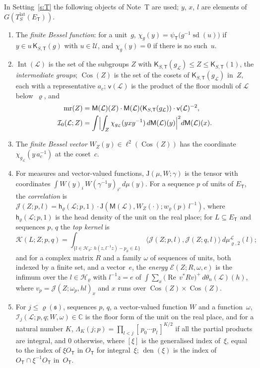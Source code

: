 \documentclass[11pt,a4paper]{article}
\newcommand{\m}[1]{\mbox{$#1$}}        %
\theoremstyle{plainx}
\theoremstyle{uprightx}
\newcommand{\fs}{\mathfrak{s}}                      %
\newcommand{\sT}{\mathsf{T}}                        %
\newcommand{\cL}{\mathcal{L}}                       %
\newcommand{\rh}[1]{\varrho(#1)}                    %
\newcommand{\ET}[1]{E_{#1}}                         %
\newcommand{\Tlat}[2]{T^{\mathrm{lat}}_{#1}(#2)}    %
\newcommand{\phs}[2]{\chi_{#1}(#2)}                 %
\newcommand{\IntG}[1]{\operatorname{Int}(#1)}       %
\newcommand{\umass}[1]{\mathsf{v}(#1)}              %
\newcommand{\fzf}[2]{\mathcal{I}_{0}(#1;#2)}        %
\newcommand{\Cos}[1]{\operatorname{Cos}(#1)}        %
\newcommand{\mr}[1]{\operatorname{mr}(#1)}          %
\newcommand{\bvec}[2]{W_{#1}(#2)}                   %
\newcommand{\corr}[3]{\mathcal{J}(#1;#2,#3)}        %
\newcommand{\topK}[4]{\mathcal{K}(#1;#2;#3,#4)}     %
\newcommand{\lenergy}[4]{\mathcal{E}(#1;#2,#3,#4)}  %
\newcommand{\KT}[3]{\mathsf{K}_{#1,#2}(#3)}                  %
\newcommand{\gM}[1]{\mathsf{M}(#1)}                 %
\newcommand{\mH}[1]{\theta_{n}(#1)}                 %
\newcommand{\hdens}[4]{\mathsf{h}_{#2}(#1;#3,#4)}   %
\newcommand{\fform}[6]{\mathcal{I}_{#2}(#1;#3,#4;#5,#6)} %
\newcommand{\bcorr}[3]{\mathrm{J}(#1,#2;#3)}        %
\newcommand{\fhw}[3]{\Lambda_{#1}(#2;#3)}           %
\newcommand{\weyl}[2]{w_{#1}(#2)}                   %
\newcommand{\rePart}{\operatorname{Re}}
\newcommand{\CC}{\mathbb{C}}
\begin{document}
In Setting~\ref{s:T} the following objects of Note~T are used; $y$, $x$, $l$ are elements of
\m{G(\Tlat{S}{\ET{\sT}})}.
\begin{enumerate}[label=\textup{(\alph*)},leftmargin=2.3em,itemsep=2pt]
\item The \emph{finite Bessel function}: for a unit~$g$, \m{\phs{g}{y}=\psi_{\sT}\bigl(g^{-1}\operatorname{sd}(u)\bigr)}
if \m{y\in u\,\KT{S}{\sT}{g}} with \m{u\in\mathcal U}, and \m{\phs{g}{y}=0} if there is no such~$u$.
\item \m{\IntG{\cL}} is the set of the subgroups $Z$ with \m{\KT{S}{\sT}{g_{\cL}}\le Z\le\KT{S}{\sT}{1}}, the
\emph{intermediate groups}; \m{\Cos{Z}} is the set of the cosets of \m{\KT{S}{\sT}{g_{\cL}}} in~$Z$, each with a
representative $a_c$; \m{\umass{\cL}} is the product of the floor moduli of $\cL$ below~$\varrho$, and
\[\begin{aligned}\mr{Z}&=\gM{\cL}(Z)\cdot\gM{\cL}(\KT{S}{\sT}{g_{\cL}})\cdot\umass{\cL}^{-2},\\
\fzf{\cL}{Z}&=\int\Bigl|\int_Z\phs{g_{\cL}}{yxy^{-1}}\,d\gM{\cL}(y)\Bigr|^2d\gM{\cL}(x).\end{aligned}\]
\item The \emph{finite Bessel vector} \m{\bvec{Z}{y}\in\ell^2(\Cos{Z})} has the coordinate
\m{\phs{g_{\cL}}{y\,a_c^{-1}}} at the coset~$c$.
\item For measures and vector-valued functions, \m{\bcorr{\mu}{W}{\gamma}} is the tensor with coordinates
\m{\int W(y)_i\,\overline{W(\gamma^{-1}y)_{i'}}\,d\mu(y)}. For a sequence $p$ of units of \m{\ET{\sT}}, the
\emph{correlation} is \m{\corr{Z}{p}{l}=\hdens{\cL}{\varrho}{p}{1}\cdot\bcorr{\gM{\cL}}{\bvec{Z}{\cdot}}{\weyl{\varrho}{p}\,l^{-1}}},
where \m{\hdens{\cL}{\varrho}{p}{1}} is the head density of the unit on the real place; for
\m{L\subseteq\ET{\sT}} and sequences $p$, $q$ the \emph{top kernel} is
\[\topK{L}{Z}{p}{q}=\int_{\{l\in\mathcal H_\varrho:\ h(z,l^{-1}z)-p_\varrho\in L\}}
\bigl\langle\corr{Z}{p}{l},\corr{Z}{q}{l}\bigr\rangle\,d\mu^{\cL}_{\varrho,2}(l);\]
and for a complex matrix $R$ and a family $\omega$ of sequences of units, both indexed by a finite set, and a
vector~$e$, the \emph{energy} \m{\lenergy{Z}{R}{\omega}{e}} is the infimum over the \m{l\in\mathcal H_\varrho} with
\m{l^{-1}z=e} of \m{\int\sum_{x}\bigl(\rePart\,v^*Rv\bigr)^{+}\,d\mH{\cL}(h)}, where
\m{v_p=\corr{Z}{\omega_p}{hl}_x} and $x$ runs over \m{\Cos{Z}\times\Cos{Z}}.
\item For $j\le\rh{\fs}$, sequences $p$, $q$, a vector-valued function $W$ and a function~$\omega$,
\m{\fform{\cL}{j}{p}{q}{W}{\omega}\in\CC} is the floor form of the unit on the real place, and for a natural
number $K$, \m{\fhw{K}{j}{p}=\prod_{l<j}[\,p_0\cdots p_l\,]^{K/2}} if all the partial products are integral, and
$0$ otherwise, where \m{[\xi]} is the generalised index of~$\xi$, equal to the index of \m{\xi O_{\sT}} in
$O_{\sT}$ for integral~$\xi$; \m{\operatorname{den}(\xi)} is the index of \m{O_{\sT}\cap\xi^{-1}O_{\sT}}
in~$O_{\sT}$.
\end{enumerate}
\end{document}
